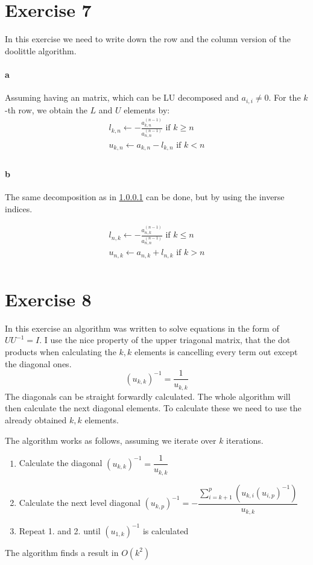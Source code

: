 \section{Exercise 7}
In this exercise we need to write down the row and the column version of the doolittle algorithm.
\paragraph{a}
\label{par:a}
Assuming having an matrix, which can be LU decomposed and $a_{i,i} \neq 0$. For the $k$-th row, we obtain the $L$ and $U$ elements by:
\begin{gather*}
l_{k,n} \leftarrow -\frac{a_{k,n}^{(n-1)}}{a_{n,n}^{(n-1)}} \text{ if } k \geq n \\
u_{k,n} \leftarrow a_{k,n} - l_{k,n}  \text{ if } k < n \\
\end{gather*}

\paragraph{b}
The same decomposition as in \ref{par:a} can be done, but by using the inverse indices.

\begin{gather*}
l_{n,k} \leftarrow -\frac{a_{n,k}^{(n-1)}}{a_{n,n}^{(n-1)}} \text{ if } k \leq n \\
u_{n,k} \leftarrow a_{n,k} + l_{n,k}  \text{ if } k > n \\
\end{gather*}

\section{Exercise 8}
In this exercise an algorithm was written to solve equations in the form of $UU^{-1} = I $.
I use the nice property of the upper triagonal matrix, that the dot products when calculating the $k,k$ elements is cancelling every term out except the diagonal ones.
\begin{equation}
(u_{k,k})^{-1} = \frac{1}{u_{k,k}}
\end{equation}
The diagonals can be straight forwardly calculated. The whole algorithm will then calculate the next diagonal elements. To calculate these we need to use the already obtained $k,k$ elements.

The algorithm works as follows, assuming we iterate over $k$ iterations.
\begin{enumerate}
\item Calculate the diagonal $(u_{k,k})^{-1} = \dfrac{1}{u_{k,k}}$
\item Calculate the next level diagonal $(u_{k,p})^{-1} = - \dfrac{\sum\limits_{i=k+1}^{p} \left( u_{k,i} (u_{i,p})^{-1}\right)}{u_{k,k}} $
\item Repeat 1. and 2. until $(u_{1,k})^{-1}$ is calculated
\end{enumerate}
The algorithm finds a result in $O(k^2)$

